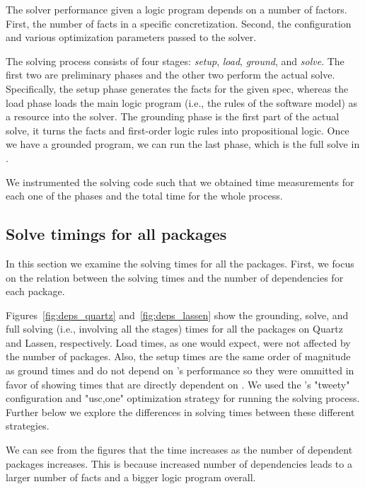 
The \clingo{} solver performance given a logic program depends
on a number of factors. First, the number of facts in a specific concretization. Second,
the configuration and various optimization parameters passed to the solver. 

The solving process consists of four stages: \emph{setup}, \emph{load}, 
\emph{ground}, and \emph{solve}. The first two are preliminary phases and the other two 
perform the actual solve. Specifically, the setup phase generates the facts for the given
spec, whereas the load phase loads the main logic program (i.e., the rules of the software 
model) as a resource into the solver. The grounding phase is the first part of the actual
solve, it turns the facts and first-order logic rules into propositional logic. Once we
have a grounded program, we can run the last phase, which is the full solve in \clingo{}.

We instrumented the solving code such that we obtained time measurements for each one
of the phases and the total time for the whole process.

\subsection{Solve timings for all packages}

In this section we examine the solving times for all the packages. First, we focus on
the relation between the solving times and the number of dependencies for each package.





Figures~\ref{fig:deps_quartz} and~\ref{fig:deps_lassen} show the grounding, solve, and full solving (i.e., involving all the stages) times for all the packages on Quartz and Lassen, respectively. Load times, as one would expect, were not affected by the number of packages. Also, the setup times are the same order of magnitude as ground times and do not depend on \clingo{}'s performance so they were ommitted in favor of showing times that are directly dependent on \clingo{}. We used the \clingo{}'s "tweety" configuration and "usc,one" optimization strategy for running the solving process. Further below we explore the differences in solving times between these different strategies.

We can see from the figures that the time increases as the number of dependent packages increases. This is because increased number of dependencies leads to a larger number of facts and a bigger logic program overall.

